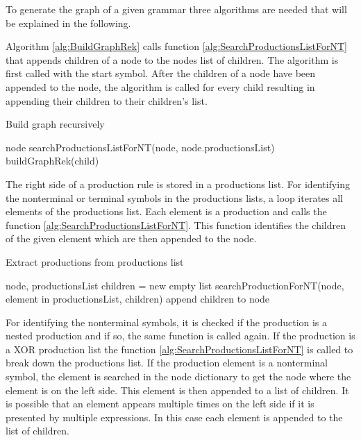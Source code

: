 To generate the graph of a given grammar three algorithms are needed that will be explained in the following.

Algorithm \ref{alg:BuildGraphRek} calls function \ref{alg:SearchProductionsListForNT} that appends children of a node to the nodes list of children.
The algorithm is first called with the start symbol.
After the children of a node have been appended to the node, the algorithm is called for every child resulting in appending their children to their children's list.

\begin{algorithm}[H]
\caption{Build graph recursively}
\label{alg:BuildGraphRek}
\begin{algorithmic}[1] 
\Require node
\State searchProductionsListForNT(node, node.productionsList)
		\State buildGraphRek(child)
	\EndFor
\EndIf
\end{algorithmic}
\end{algorithm}

The right side of a production rule is stored in a productions list.
For identifying the nonterminal or terminal symbols in the productions lists, a loop iterates all elements of the productions list.
Each element is a production and calls the function \ref{alg:SearchProductionsListForNT}.
This function identifies the children of the given element which are then appended to the node.

\begin{algorithm}[H]
\caption{Extract productions from productions list}
\label{alg:SearchProductionsListForNT}
\begin{algorithmic}[1] 
\Require node, productionsList
	\State children = new empty list
	\State searchProductionForNT(node, element in productionsList, children)
	\State append children to node
\EndFor
\end{algorithmic}
\end{algorithm}

For identifying the nonterminal symbols, it is checked if the production is a nested production and if so, the same function is called again.
If the production is a XOR production list the function \ref{alg:SearchProductionsListForNT} is called to break down the productions list.
If the production element is a nonterminal symbol, the element is searched in the node dictionary to get the node where the element is on the left side.
This element is then appended to a list of children. It is possible that an element appears multiple times on the left side if it is presented by multiple expressions.
In this case each element is appended to the list of children.

